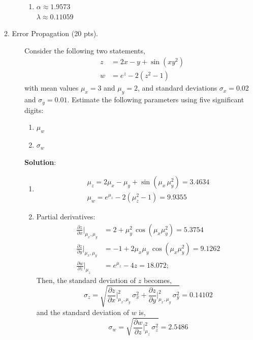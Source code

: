 \documentclass[12pt]{article}
\begin{document}
\begin{description}
\begin{enumerate}[label=\textbf{(d)}]
    \item $\alpha \approx 1.9573$ \\
    $\lambda \approx 0.11059$ \\
\end{enumerate}
\color{black}
\fi


\item[2. Error Propagation (20 pts).] Consider the following two statements,
\begin{align*}
    z &= 2 x - y + \sin(x y^2) \\
    w &= e^z - 2 (z^2 - 1)
\end{align*}
with mean values $\mu_x = 3$ and $\mu_y = 2$, and standard deviations $\sigma_x = 0.02$ and $\sigma_y = 0.01$. Estimate the following parameters using five significant digits: 
	\begin{enumerate}[label=\textbf{(\alph*)}]
	\item $\mu_w$
	\item $\sigma_w$
	\end{enumerate}

    \color{red}
    \ifsolution
    {\bf Solution}:\\
    \begin{enumerate}[label=\textbf{(\alph*)}]
    
    \item 
    \begin{align*} 
        \mu_z = 2 \mu_x - \mu_y + \sin(\mu_x \, \mu_y^2) = 3.4634\\
        \mu_w = e^{\mu_z} - 2 (\mu_z^2 - 1) = 9.9355
    \end{align*}
    
    \item Partial derivatives:
    \begin{align*}
      \frac{\partial z}{\partial x}\Bigr\rvert_{\mu_x,\mu_y} &= 2 + \mu_y^2 \, \cos(\mu_x \mu_y^2) = 5.3754 \\
      \frac{\partial z}{\partial y}\Bigr\rvert_{\mu_x,\mu_y} &= -1 + 2\mu_x \mu_y \, \cos(\mu_x \mu_y^2) = 9.1262 \\
      \frac{\partial w}{\partial z}\Bigr\rvert_{\mu_z} &= e^{\mu_z} - 4z = 18.072;
    \end{align*}
    Then, the standard deviation of $z$ becomes,
        \begin{equation*}
      \sigma_z = \sqrt{\frac{\partial z}{\partial x}\Bigr\rvert_{\mu_x,\mu_y}^2 \, \sigma_x^2 + \frac{\partial z}{\partial y}\Bigr\rvert_{\mu_x,\mu_y}^2 \, \sigma_y^2} = 0.14102
    \end{equation*}
    and the standard deviation of $w$ is,
        \begin{equation*}
      \sigma_w = \sqrt{\frac{\partial w}{\partial z}\Bigr\rvert_{\mu_z}^2 \, \sigma_z^2} = 2.5486
    \end{equation*}
    

\end{enumerate}
\end{description}
\end{document}
